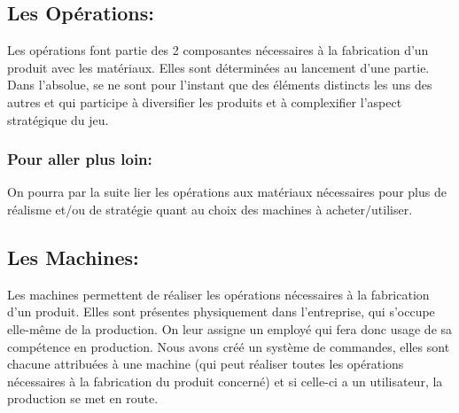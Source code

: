 


\clearpage



\subsection{Les Opérations:}



Les opérations font partie des 2 composantes nécessaires à la fabrication d’un produit avec les matériaux. Elles sont déterminées au lancement d’une partie. Dans l’absolue, se ne sont pour l’instant que des éléments distincts les uns des autres et qui participe à diversifier les produits et à complexifier l’aspect stratégique du jeu. 



\subsubsection*{Pour aller plus loin:} 



On pourra par la suite lier les opérations aux matériaux nécessaires pour plus de réalisme et$/$ou de stratégie quant au choix des machines à acheter$/$utiliser.



\subsection{Les Machines:}



Les machines permettent de réaliser les opérations nécessaires à la fabrication d’un produit. Elles sont présentes physiquement dans l’entreprise, qui s’occupe elle-même de la production. On leur assigne un employé qui fera donc usage de sa compétence en production. Nous avons créé un système de commandes, elles sont chacune attribuées à une machine (qui peut réaliser toutes les opérations nécessaires à la fabrication du produit concerné) et si celle-ci a un utilisateur, la production se met en route.



